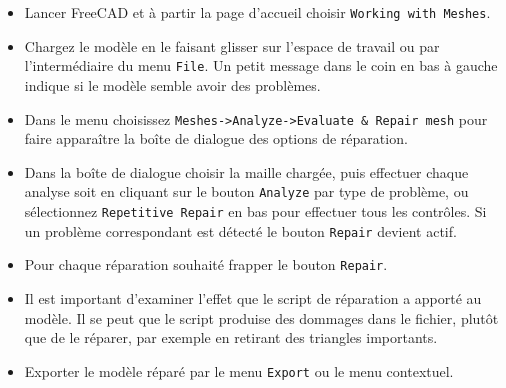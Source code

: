 \begin{itemize}
	\item Lancer FreeCAD et \`a partir la page d'accueil choisir \texttt{Working with Meshes}.
	\item Chargez le mod\`ele en le faisant glisser sur l'espace de travail ou par l'interm\'ediaire du menu \texttt{File}.  Un petit message dans le coin en bas \`a gauche indique si le mod\`ele semble avoir des probl\`emes.
	\item Dans le menu choisissez \texttt{Meshes->Analyze->Evaluate \& Repair mesh} pour faire appara\^itre la bo\^ite de dialogue des options de r\'eparation.
	\item Dans la bo\^ite de dialogue choisir la maille charg\'ee, puis effectuer chaque analyse soit en cliquant sur le bouton \texttt{Analyze} par type de probl\`eme, ou s\'electionnez \texttt{Repetitive Repair} en bas pour effectuer tous les contr\^oles. Si un probl\`eme  correspondant est d\'etect\'e le bouton \texttt{Repair} devient actif.
	\item Pour chaque r\'eparation souhait\'e frapper le bouton \texttt{Repair}.
	\item Il est important d'examiner l'effet que le script de r\'eparation a apport\'e au mod\`ele.  Il se peut que le script produise des dommages dans le fichier, plut\^ot que de le r\'eparer, par exemple en retirant des triangles importants.
	\item Exporter le mod\`ele r\'epar\'e par le menu \texttt{Export} ou le menu contextuel.
\end{itemize}
